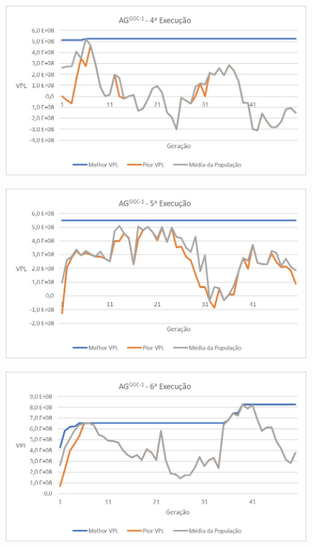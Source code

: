 \documentclass[12pt,a4paper]{report}
\begin{document}
\begin{figure}[H]
\centering

\includegraphics[scale=1]{GCC/4}
\end{figure}

\begin{figure}[htb]
\centering

\includegraphics[scale=1]{GCC/5}
\end{figure}


\begin{figure}[H]
\centering

\includegraphics[scale=1]{GCC/6}
\end{figure}
\end{document}
